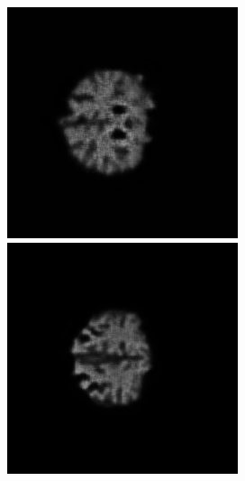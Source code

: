\documentclass[12pt, fleqn, titlepage]{article}
\newcommand\skipper{1.4pt}
\begin{document}
\begin{figure}[H]
\begin{subfigure}[b]{0.7\textwidth}
		\hskip\skipper
		\includegraphics[width=0.32\linewidth]{imgs/placeholder_idx_25000}
		\hskip\skipper
		\includegraphics[width=0.32\linewidth]{imgs/placeholder_idx_40000}
	\end{subfigure}
\end{figure}
\end{document}
